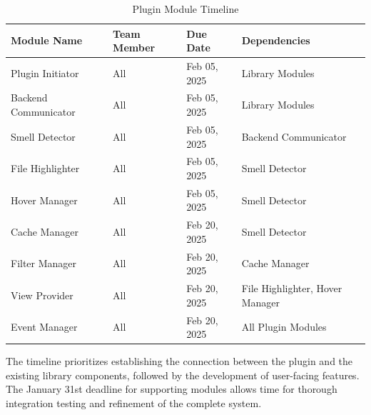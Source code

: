 \documentclass[12pt, titlepage]{article}
\begin{document}
\begin{table}[h!]
  \centering
  \caption{Plugin Module Timeline}
  \begin{tabular}{|l|l|l|l|}
  \hline
  \textbf{Module Name} & \textbf{Team Member} & \textbf{Due Date} & \textbf{Dependencies} \\ \hline
  Plugin Initiator & All & Feb 05, 2025 & Library Modules \\ \hline
  Backend Communicator & All & Feb 05, 2025 & Library Modules \\ \hline
  Smell Detector & All & Feb 05, 2025 & Backend Communicator \\ \hline
  File Highlighter & All & Feb 05, 2025 & Smell Detector \\ \hline
  Hover Manager & All & Feb 05, 2025 & Smell Detector \\ \hline
  Cache Manager & All & Feb 20, 2025 & Smell Detector \\ \hline
  Filter Manager & All & Feb 20, 2025 & Cache Manager \\ \hline
  View Provider & All & Feb 20, 2025 & File Highlighter, Hover Manager \\ \hline
  Event Manager & All & Feb 20, 2025 & All Plugin Modules \\ \hline
  \end{tabular}
\end{table}

The timeline prioritizes establishing the connection between the plugin and the existing library components, followed by the development of user-facing features. The January 31st deadline for supporting modules allows time for thorough integration testing and refinement of the complete system.
\end{document}
